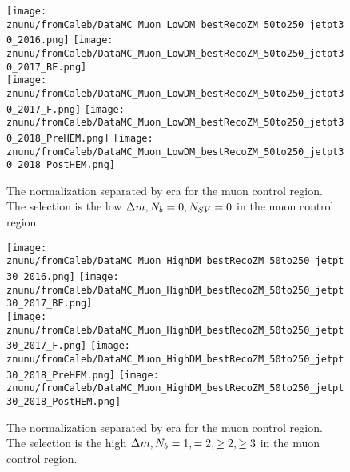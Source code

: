\begin{figure}[!h]
	\begin{center}
    \texttt{[image: znunu/fromCaleb/DataMC\_Muon\_LowDM\_bestRecoZM\_50to250\_jetpt30\_2016.png]}
    \texttt{[image: znunu/fromCaleb/DataMC\_Muon\_LowDM\_bestRecoZM\_50to250\_jetpt30\_2017\_BE.png]} \\
    \texttt{[image: znunu/fromCaleb/DataMC\_Muon\_LowDM\_bestRecoZM\_50to250\_jetpt30\_2017\_F.png]}
    \texttt{[image: znunu/fromCaleb/DataMC\_Muon\_LowDM\_bestRecoZM\_50to250\_jetpt30\_2018\_PreHEM.png]}
    \texttt{[image: znunu/fromCaleb/DataMC\_Muon\_LowDM\_bestRecoZM\_50to250\_jetpt30\_2018\_PostHEM.png]}
	\end{center}
	\caption[\Znunu{} Normalization in low \dm{} for muons]{The \Znunu{} normalization separated by era for the muon control region. The selection is the low $\Delta m, N_{b}=0, N_{SV}=0$ in the muon control region.
	 }
	\label{fig:znunu-norm-lm-muon}
\end{figure}

\begin{figure}[!h]
	\begin{center}
    \texttt{[image: znunu/fromCaleb/DataMC\_Muon\_HighDM\_bestRecoZM\_50to250\_jetpt30\_2016.png]}
    \texttt{[image: znunu/fromCaleb/DataMC\_Muon\_HighDM\_bestRecoZM\_50to250\_jetpt30\_2017\_BE.png]} \\
    \texttt{[image: znunu/fromCaleb/DataMC\_Muon\_HighDM\_bestRecoZM\_50to250\_jetpt30\_2017\_F.png]}
    \texttt{[image: znunu/fromCaleb/DataMC\_Muon\_HighDM\_bestRecoZM\_50to250\_jetpt30\_2018\_PreHEM.png]}
    \texttt{[image: znunu/fromCaleb/DataMC\_Muon\_HighDM\_bestRecoZM\_50to250\_jetpt30\_2018\_PostHEM.png]}
	\end{center}
	\caption[\Znunu{} Normalization in high \dm{} for muons]{The \Znunu{} normalization separated by era for the muon control region. The selection is the high $\Delta m, N_{b}=1, =2, \geq2,\geq3$ in the muon control region.
	 }
	\label{fig:znunu-norm-hm-muon}
\end{figure}

